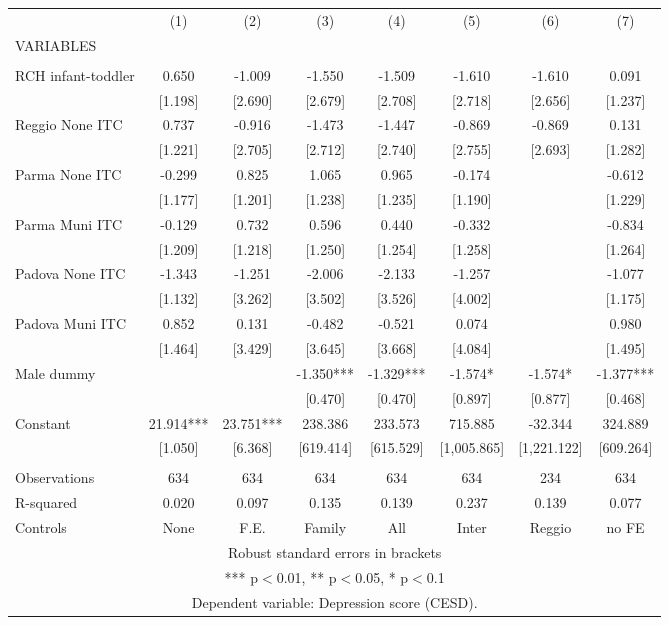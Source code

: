 \begin{tabular}{lccccccc} \hline
 & (1) & (2) & (3) & (4) & (5) & (6) & (7) \\
VARIABLES &  &  &  &  &  &  &  \\ \hline
 &  &  &  &  &  &  &  \\
RCH infant-toddler & 0.650 & -1.009 & -1.550 & -1.509 & -1.610 & -1.610 & 0.091 \\
 & [1.198] & [2.690] & [2.679] & [2.708] & [2.718] & [2.656] & [1.237] \\
Reggio None ITC & 0.737 & -0.916 & -1.473 & -1.447 & -0.869 & -0.869 & 0.131 \\
 & [1.221] & [2.705] & [2.712] & [2.740] & [2.755] & [2.693] & [1.282] \\
Parma None ITC & -0.299 & 0.825 & 1.065 & 0.965 & -0.174 &  & -0.612 \\
 & [1.177] & [1.201] & [1.238] & [1.235] & [1.190] &  & [1.229] \\
Parma Muni ITC & -0.129 & 0.732 & 0.596 & 0.440 & -0.332 &  & -0.834 \\
 & [1.209] & [1.218] & [1.250] & [1.254] & [1.258] &  & [1.264] \\
Padova None ITC & -1.343 & -1.251 & -2.006 & -2.133 & -1.257 &  & -1.077 \\
 & [1.132] & [3.262] & [3.502] & [3.526] & [4.002] &  & [1.175] \\
Padova Muni ITC & 0.852 & 0.131 & -0.482 & -0.521 & 0.074 &  & 0.980 \\
 & [1.464] & [3.429] & [3.645] & [3.668] & [4.084] &  & [1.495] \\
Male dummy &  &  & -1.350*** & -1.329*** & -1.574* & -1.574* & -1.377*** \\
 &  &  & [0.470] & [0.470] & [0.897] & [0.877] & [0.468] \\
Constant & 21.914*** & 23.751*** & 238.386 & 233.573 & 715.885 & -32.344 & 324.889 \\
 & [1.050] & [6.368] & [619.414] & [615.529] & [1,005.865] & [1,221.122] & [609.264] \\
 &  &  &  &  &  &  &  \\
Observations & 634 & 634 & 634 & 634 & 634 & 234 & 634 \\
R-squared & 0.020 & 0.097 & 0.135 & 0.139 & 0.237 & 0.139 & 0.077 \\
 Controls & None & F.E. & Family & All & Inter & Reggio & no FE \\ \hline
\multicolumn{8}{c}{ Robust standard errors in brackets} \\
\multicolumn{8}{c}{ *** p$<$0.01, ** p$<$0.05, * p$<$0.1} \\
\multicolumn{8}{c}{ Dependent variable: Depression score (CESD).} \\
\end{tabular}
